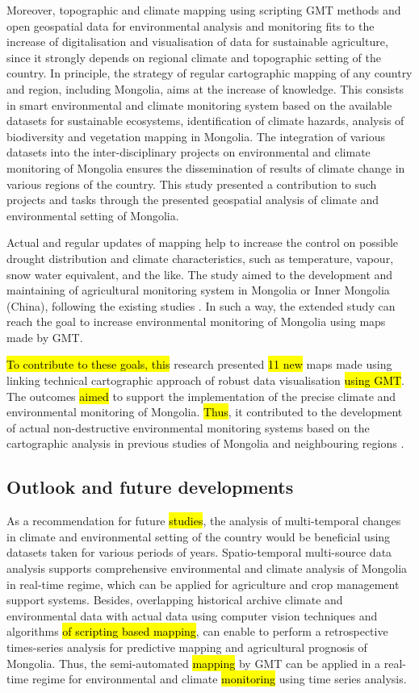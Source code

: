 \documentclass[geosciences,article,submit,pdftex,moreauthors]{Definitions/mdpi}
\begin{document}
Moreover, topographic and climate mapping using scripting GMT methods and open geospatial data for environmental analysis and monitoring fits to the increase of digitalisation and visualisation of data for sustainable agriculture, since it strongly depends on regional climate and topographic setting of the country. In principle, the strategy of regular cartographic mapping of any country and region, including Mongolia, aims at the increase of knowledge. This consists in smart environmental and climate monitoring system based on the available datasets for sustainable ecosystems, identification of climate hazards, analysis of biodiversity and vegetation mapping in Mongolia. The integration of various datasets into the inter-disciplinary projects on environmental and climate monitoring of Mongolia ensures the dissemination of results of climate change in various regions of the country. This study presented a contribution to such projects and tasks through the presented geospatial analysis of climate and environmental setting of Mongolia.

Actual and regular updates of mapping help to increase the control on possible drought distribution and climate characteristics, such as temperature, vapour, snow water equivalent, and the like. The study aimed to the development and maintaining of agricultural monitoring system in Mongolia or Inner Mongolia (China), following the existing studies \cite{Rina,Long,Zheng}. In such a way, the extended study can reach the goal to increase environmental monitoring of Mongolia using maps made by GMT.

\hl{To contribute to these goals, this} research presented \hl{11 new} maps made using linking technical cartographic approach of robust data visualisation \hl{using GMT}. The outcomes \hl{aimed} to support the implementation of the precise climate and environmental monitoring of Mongolia. \hl{Thus}, it contributed to the development of actual non-destructive environmental monitoring systems based on the cartographic analysis in previous studies of Mongolia and neighbouring regions \cite{MENG2021107908,DASHPUREV2021108331,SAINNEMEKH2022104654,Batunacun}. 

\subsection{Outlook and future developments}
As a recommendation for future \hl{studies}, the analysis of multi-temporal changes in climate and environmental setting of the country would be beneficial using datasets taken for various periods of years. Spatio-temporal multi-source data analysis supports comprehensive environmental and climate analysis of Mongolia in real-time regime, which can be applied for agriculture and crop management support systems. Besides, overlapping historical archive climate and environmental data with actual data using computer vision techniques and algorithms \hl{of scripting based mapping}, can enable to perform a retrospective times-series analysis for predictive mapping and agricultural prognosis of Mongolia. Thus, the semi-automated \hl{mapping} by GMT can be applied in a real-time regime for environmental and climate \hl{monitoring} using time series analysis.  
\end{document}
